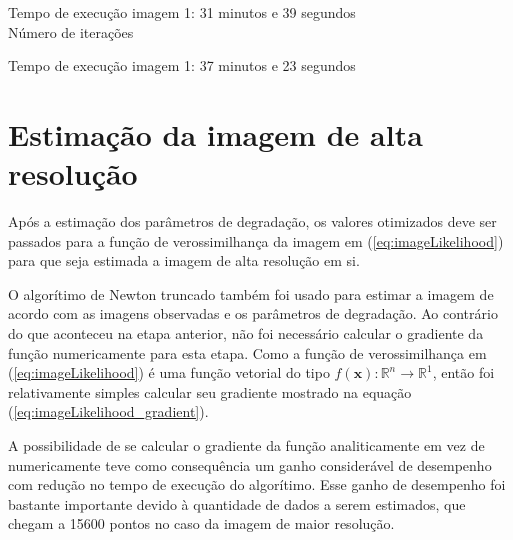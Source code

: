 Tempo de execução imagem 1: 31 minutos e 39 segundos \\
Número de iterações

Tempo de execução imagem 1: 37 minutos e 23 segundos


\section{Estimação da imagem de alta resolução}
Após a estimação dos parâmetros de degradação, os valores otimizados deve ser passados para a função de verossimilhança da imagem em (\ref{eq:imageLikelihood}) para que seja estimada a imagem de alta resolução em si.

O algorítimo de Newton truncado também foi usado para estimar a imagem de acordo com as imagens observadas e os parâmetros de degradação.
Ao contrário do que aconteceu na etapa anterior, não foi necessário calcular o gradiente da função numericamente para esta etapa.
Como a função de verossimilhança em (\ref{eq:imageLikelihood}) é uma função vetorial do tipo $ f(\mathbf{x}) : \mathbb{R}^n \to \mathbb{R}^1$, então foi relativamente simples calcular seu gradiente mostrado na equação (\ref{eq:imageLikelihood_gradient}).

A possibilidade de se calcular o gradiente da função analiticamente em vez de numericamente teve como consequência um ganho considerável de desempenho com redução no tempo de execução do algorítimo.
Esse ganho de desempenho foi bastante importante devido à quantidade de dados a serem estimados, que chegam a 15600 pontos no caso da imagem de maior resolução.

